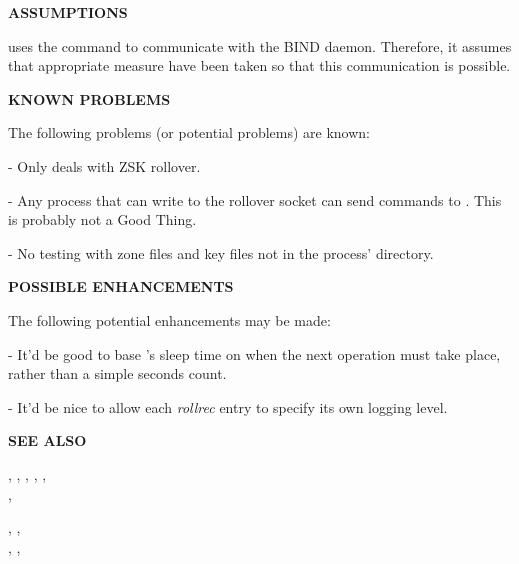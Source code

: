 {\bf ASSUMPTIONS}

 uses the  command to communicate with the BIND
 daemon.  Therefore, it assumes that appropriate measure have been
taken so that this communication is possible.

{\bf KNOWN PROBLEMS}

The following problems (or potential problems) are known:

\begin{description}

\item - Only deals with ZSK rollover.

\item - Any process that can write to the rollover socket can send commands to
.  This is probably not a Good Thing.

\item - No testing with zone files and key files not in the process' directory.

\end{description}

{\bf POSSIBLE ENHANCEMENTS}

The following potential enhancements may be made:

\begin{description}

\item - It'd be good to base 's sleep time on when the next
operation must take place, rather than a simple seconds count.

\item - It'd be nice to allow each {\it rollrec} entry to specify its own
logging level.

\end{description}

{\bf SEE ALSO}

,
,
,
,
,	\\
,

,
, \\
,
, \\

